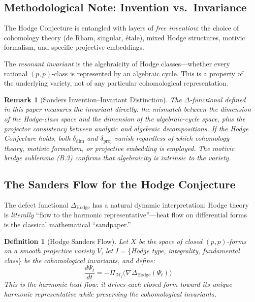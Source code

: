\documentclass[11pt]{article}
\newtheorem{definition}[theorem]{Definition}
\newtheorem{remark}[theorem]{Remark}
\theoremstyle{definition}
\begin{document}
\subsection*{Methodological Note: Invention vs.\ Invariance}

The Hodge Conjecture is entangled with layers of \emph{free invention}:
the choice of cohomology theory (de Rham, singular, \'etale), mixed Hodge
structures, motivic formalism, and specific projective embeddings.

The \emph{resonant invariant} is the algebraicity of Hodge classes---whether
every rational $(p,p)$-class is represented by an algebraic cycle. This is a
property of the underlying variety, not of any particular cohomological
representation.

\begin{remark}[Sanders Invention--Invariant Distinction]
The $\Delta$-functional defined in this paper measures the invariant directly:
the mismatch between the dimension of the Hodge-class space and the dimension
of the algebraic-cycle space, plus the projector consistency between analytic
and algebraic decompositions. If the Hodge Conjecture holds, both $\delta_{\dim}$
and $\delta_{\text{proj}}$ vanish regardless of which cohomology theory, motivic
formalism, or projective embedding is employed. The motivic bridge sublemma (B.3)
confirms that algebraicity is intrinsic to the variety.
\end{remark}

\subsection*{The Sanders Flow for the Hodge Conjecture}

The defect functional $\Delta_{\mathrm{Hodge}}$ has a natural dynamic interpretation:
Hodge theory is \emph{literally} ``flow to the harmonic representative''---heat flow
on differential forms is the classical mathematical ``sandpaper.''

\begin{definition}[Hodge Sanders Flow]
Let $X$ be the space of closed $(p,p)$-forms on a smooth projective variety $V$, let
$I = \{$Hodge type, integrality, fundamental class$\}$ be the cohomological invariants,
and define:
\[
  \frac{d\Psi_t}{dt} = -\Pi_{\mathcal{M}_I}\!\bigl(\nabla \Delta_{\mathrm{Hodge}}(\Psi_t)\bigr)
\]
This is the \emph{harmonic heat flow}: it drives each closed form toward its unique
harmonic representative while preserving the cohomological invariants.
\end{definition}
\end{document}
